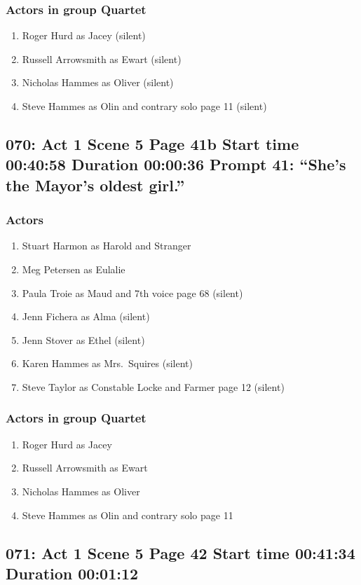 \subsubsection{Actors in group Quartet}
\begin{enumerate}
\item Roger Hurd as Jacey (silent)
\item Russell Arrowsmith as Ewart (silent)
\item Nicholas Hammes as Oliver (silent)
\item Steve Hammes as Olin and contrary solo page 11 (silent)
\end{enumerate}


\subsection{070: Act 1 Scene 5 Page 41b Start time 00:40:58 Duration 00:00:36 Prompt 41: ``She's the Mayor's oldest girl.''}

\subsubsection{Actors}
\begin{enumerate}
\item Stuart Harmon as Harold and Stranger
\item Meg Petersen as Eulalie
\item Paula Troie as Maud and 7th voice page 68 (silent)
\item Jenn Fichera as Alma (silent)
\item Jenn Stover as Ethel (silent)
\item Karen Hammes as Mrs.~Squires (silent)
\item Steve Taylor as Constable Locke and Farmer page 12 (silent)
\end{enumerate}
\subsubsection{Actors in group Quartet}
\begin{enumerate}
\item Roger Hurd as Jacey
\item Russell Arrowsmith as Ewart
\item Nicholas Hammes as Oliver
\item Steve Hammes as Olin and contrary solo page 11
\end{enumerate}


\subsection{071: Act 1 Scene 5 Page 42 Start time 00:41:34 Duration 00:01:12}

